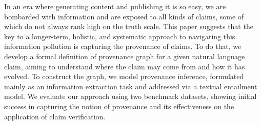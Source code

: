 In an era where generating content and publishing it is so easy, we are bombarded with information and are exposed to all kinds of claims, some of which do not always rank high on  the truth scale. This paper suggests that the key to a longer-term, holistic, and systematic approach to navigating this information pollution is capturing the provenance of claims. To do that, we develop a formal definition of provenance graph for a given natural language claim, aiming to understand where the claim may come from and how it has evolved. To construct the graph, we model provenance inference, formulated mainly as an information extraction task and addressed via a textual entailment model.  We  evaluate  our  approach using two benchmark datasets,  showing initial success in capturing the notion of provenance and its effectiveness on the application of claim verification.
